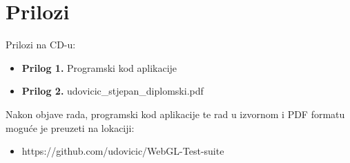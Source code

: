 \documentclass[a4paper,12pt]{extarticle}
\begin{document}
\section*{Prilozi}

Prilozi na CD-u:

\begin{itemize}
\item \textbf{Prilog 1.} Programski kod aplikacije
\item \textbf{Prilog 2.} udovicic\_stjepan\_diplomski.pdf
\end{itemize}

Nakon  objave rada, programski kod aplikacije te rad u izvornom i PDF formatu moguće je preuzeti na lokaciji:

\begin{itemize}
\item https://github.com/udovicic/WebGL-Test-suite
\end{itemize}
\end{document}
